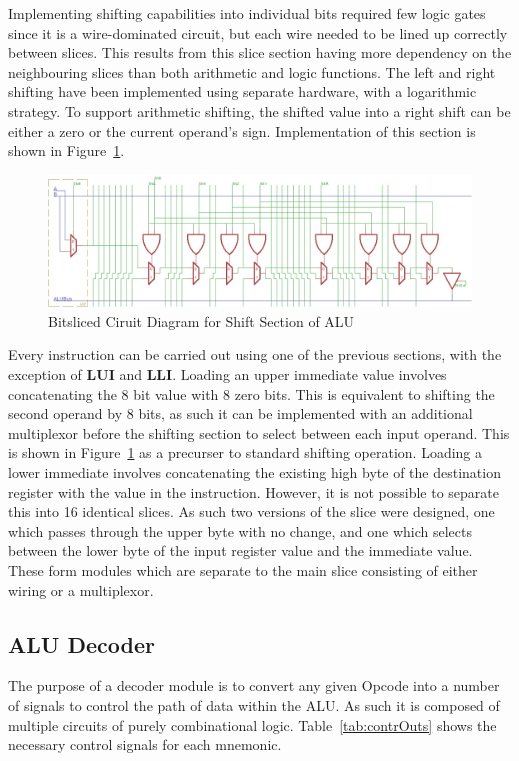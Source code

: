 Implementing shifting capabilities into individual bits required few logic gates since it is a wire-dominated circuit, but each wire needed to be lined up correctly between slices. 
This results from this slice section having more dependency on the neighbouring slices than both arithmetic and logic functions. 
The left and right shifting have been implemented using separate hardware, with a logarithmic strategy. 
To support arithmetic shifting, the shifted value into a right shift can be either a zero or the current operand's sign.
Implementation of this section is shown in Figure~\ref{fig:ShiftSlice}. 

\begin{figure}[h]
	\centering
	\includegraphics[scale=0.75]{Figures/ShiftSlice.png}
	\caption{Bitsliced Ciruit Diagram for Shift Section of ALU}
	\label{fig:ShiftSlice}
\end{figure}

Every instruction can be carried out using one of the previous sections, with the exception of \textbf{LUI} and \textbf{LLI}. 
Loading an upper immediate value involves concatenating the 8 bit value with 8 zero bits. 
This is equivalent to shifting the second operand by 8 bits, as such it can be implemented with an additional multiplexor before the shifting section to select between each input operand. 
This is shown in Figure~\ref{fig:ShiftSlice} as a precurser to standard shifting operation. 
Loading a lower immediate involves concatenating the existing high byte of the destination register with the value in the instruction. 
However, it is not possible to separate this into 16 identical slices. 
As such two versions of the slice were designed, one which passes through the upper byte with no change, and one which selects between the lower byte of the input register value and the immediate value. 
These form modules which are separate to the main slice consisting of either wiring or a multiplexor.

\subsection{ALU Decoder}
The purpose of a decoder module is to convert any given Opcode into a number of signals to control the path of data within the ALU. 
As such it is composed of multiple circuits of purely combinational logic. 
Table~\ref{tab:contrOuts} shows the necessary control signals for each mnemonic.


